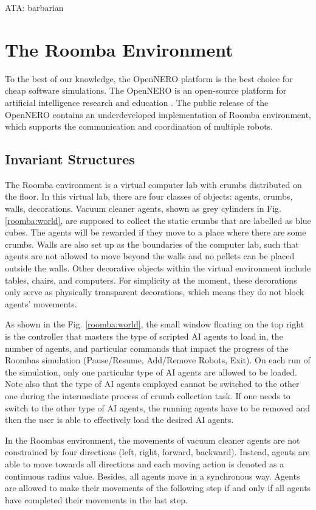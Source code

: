 \documentclass[conference]{IEEEtran}
\begin{document}
ATA: barbarian


\section{The Roomba Environment} \label{section:environment}
To the best of our knowledge, the OpenNERO platform is the best choice for
cheap software simulations. 
The OpenNERO is an open-source platform for artificial intelligence
research and education \cite{karpov2008opennero}. 
The public release of the OpenNERO contains an underdeveloped implementation
of Roomba environment, which supports the communication and coordination of
multiple robots.

\subsection{Invariant Structures}
The Roomba environment is a virtual computer lab with crumbs distributed on
the floor.
In this virtual lab, there are four classes of objects: agents, crumbs, walls,
decorations. 
Vacuum cleaner agents, shown as grey cylinders in Fig. \ref{roomba:world}, are
supposed to collect the static crumbs that are labelled as blue cubes.  
The agents will be rewarded if they move to a place where there are some
crumbs. 
Walls are also set up as the boundaries of the computer lab, such that
agents are not allowed to move beyond the walls and no pellets can be placed
outside the walls.
Other decorative objects within the virtual environment include tables, chairs, and
computers. For simplicity at the moment, these decorations only serve as
physically transparent decorations, which means they do not block agents' movements.

As shown in the Fig. \ref{roomba:world}, the small window floating on the top right
is the controller that masters the type of scripted AI agents to load in, the
number of agents, and particular commands that impact the progress of the
Roombas simulation (Pause/Resume, Add/Remove Robots, Exit). On each run of the
simulation, only one particular type of AI agents are allowed to be loaded.
Note also that the type of AI agents employed cannot be switched to the other
one during the intermediate process of crumb collection task. 
If one needs to switch to the other type of AI agents, the running agents have
to be removed and then the user is able to effectively load the desired AI agents.

In the Roombas environment, the movements of vacuum cleaner agents are not
constrained by four directions (left, right, forward, backward). Instead,
agents are able to move towards all directions and each moving action is
denoted as a continuous radius value. Besides, all agents move in a
synchronous way. Agents are allowed to make their movements of the following
step if and only if all agents have completed their movements in the last step.
\end{document}

